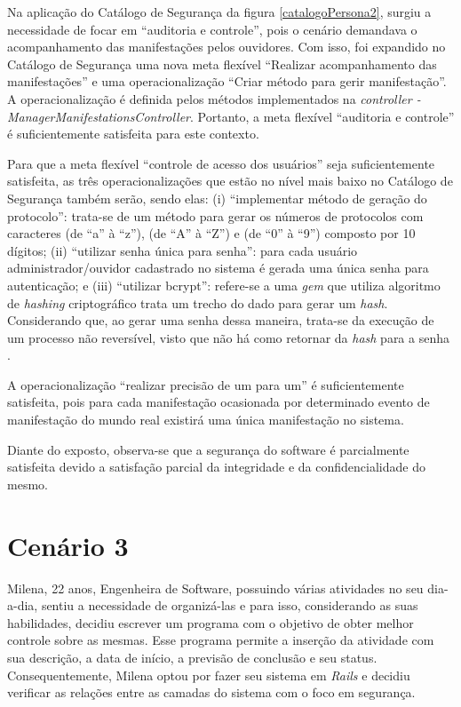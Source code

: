 Na aplicação do Catálogo de Segurança da figura \ref{catalogoPersona2}, surgiu a necessidade de focar em  “auditoria e controle”, pois o cenário demandava  o acompanhamento das manifestações pelos ouvidores. Com isso, foi expandido no Catálogo de Segurança uma nova meta flexível “Realizar acompanhamento das manifestações” e uma operacionalização “Criar método para gerir manifestação”. A operacionalização é definida pelos métodos implementados na \textit{controller - ManagerManifestationsController}. Portanto, a meta flexível “auditoria e controle” é suficientemente satisfeita para este contexto.

Para que a meta flexível “controle de acesso dos usuários” seja suficientemente satisfeita, as três operacionalizações que estão no nível mais baixo no Catálogo de Segurança também serão, sendo elas: (i) “implementar método de geração do protocolo”: trata-se de um método para gerar os números de protocolos com caracteres (de “a” à “z”), (de “A” à “Z”) e (de “0” à “9”) composto por 10 dígitos; (ii) “utilizar senha única para senha”: para cada usuário administrador/ouvidor cadastrado no sistema é gerada uma única senha para autenticação; e (iii) “utilizar bcrypt”: refere-se a uma \textit{gem} que utiliza algoritmo de \textit{hashing} criptográfico trata um trecho do dado para gerar um \textit{hash}. Considerando que, ao gerar uma senha dessa maneira, trata-se da execução de um processo não reversível, visto que não há como retornar da \textit{hash} para a senha \cite{brcypt}.

A operacionalização “realizar precisão de um para um” é suficientemente satisfeita, pois para cada manifestação ocasionada por determinado evento de manifestação do mundo real existirá uma única manifestação no sistema.

Diante do exposto, observa-se que a segurança do software é parcialmente satisfeita devido a satisfação parcial da integridade e da confidencialidade do mesmo.

\section{Cenário 3}
\label{subsec:persona3}

Milena, 22 anos, Engenheira de Software, possuindo várias atividades no seu dia-a-dia, sentiu a necessidade de organizá-las e para isso, considerando as suas habilidades, decidiu escrever um programa com o objetivo de obter melhor controle sobre as mesmas. Esse programa permite a inserção da atividade com sua descrição, a data de início, a previsão de conclusão e seu status. Consequentemente, Milena optou por fazer seu sistema em \textit{Rails} e decidiu verificar as relações entre as camadas do sistema com o foco em segurança.

